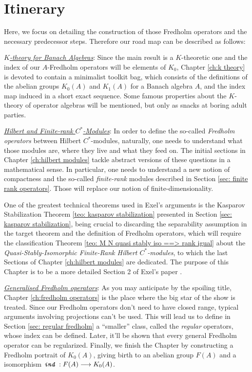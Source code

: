 \section*{Itinerary}
\thispagestyle{empty}
Here, we focus on detailing the construction of those Fredholm operators and the necessary predecessor steps. Therefore our road map can be described as follows:
\begin{itroman}
	\item \underline{\textit{$K$-theory for Banach Algebras}}: Since the main result is a $K$-theoretic one and the index of our $A$-Fredholm operators will be elements of $K_0$, Chapter \ref{ch:k theory} is devoted to contain a minimalist toolkit bag, which consists of the definitions of the abelian groups $K_0(A)$ and $K_1(A)$ for a Banach algebra $A$, and the index map induced in a short exact sequence. Some famous properties about the $K$-theory of operator algebras will be mentioned, but only as snacks at boring adult parties.
	\item \underline{\textit{Hilbert and Finite-rank \ensuremath{C^*}-Modules}}: In order to define the so-called \textit{Fredholm operators} between Hilbert $C^*$-modules, naturally, one needs to understand what those modules are, where they live and what they feed on. The initial sections in Chapter \ref{ch:hilbert modules} tackle abstract versions of these questions in a mathematical sense. In particular, one needs to understand a new notion of compactness and the so-called  \textit{finite-rank} modules described in Section \ref{sec: finite rank operators}. Those will replace our notion of finite-dimensionality. 
	
	One of the greatest technical theorems used in Exel's arguments is the Kasparov Stabilization Theorem \ref{teo: kasparov stabilization} presented in Section \ref{sec: kasparov stabilization}, being crucial to discarding the separability assumption in the target theorem and the definition of Fredholm operators, which will require the classification Theorem \ref{teo: M N quasi stably iso ==> rank igual} about the \textit{Quasi-Stably-Isomorphic Finite-Rank Hilbert $C^*$-modules}, to which the last Sections of Chapter \ref{ch:hilbert modules} are dedicated. The purpose of this Chapter is to be a more detailed Section 2 of Exel's paper \cite{exel7fredholm}.
	
	\item \underline{\textit{Generalised Fredholm operators}}: As you may anticipate by the spoiling title, Chapter \ref{ch:fredholm operators} is the place where the big star of the show is treated. Since our Fredholm operators don't need to have closed range, typical arguments involving projections can't be used. This will lead us to define in Section \ref{sec: regular fredholm} a ``smaller'' class, called the \textit{regular} operators, whose index can be defined. Later, it'll be shown that every general Fredholm operator can be regularized. Finally, we finish the Chapter by constructing a Fredholm portrait of $K_0(A)$, giving birth to an abelian group $F(A)$ and a isomorphism $\texttt{\textit{ind}}\, : F(A) \longrightarrow K_0(A)$.
	

\end{itroman}
